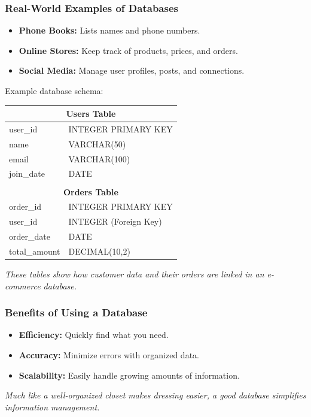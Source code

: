 \documentclass[10pt]{beamer}
\begin{document}
\begin{frame}[fragile]
  \frametitle{Real-World Examples of Databases}
  \begin{itemize}
    \item \textbf{Phone Books:} Lists names and phone numbers.
    \item \textbf{Online Stores:} Keep track of products, prices, and orders.
    \item \textbf{Social Media:} Manage user profiles, posts, and connections.
  \end{itemize}

  \vspace{1em}
  Example database schema:
  \begin{center}
    \begin{tabular}{ll}
      \hline
      \multicolumn{2}{c}{\textbf{Users Table}} \\
      \hline
      user\_id & INTEGER PRIMARY KEY \\
      name & VARCHAR(50) \\
      email & VARCHAR(100) \\
      join\_date & DATE \\
      \hline
      \\
      \multicolumn{2}{c}{\textbf{Orders Table}} \\
      \hline
      order\_id & INTEGER PRIMARY KEY \\
      user\_id & INTEGER (Foreign Key) \\
      order\_date & DATE \\
      total\_amount & DECIMAL(10,2) \\
      \hline
    \end{tabular}
  \end{center}
  \textit{These tables show how customer data and their orders are linked in an e-commerce database.}
\end{frame}

\begin{frame}[fragile]
  \frametitle{Benefits of Using a Database}
  \begin{itemize}
    \item \textbf{Efficiency:} Quickly find what you need.
    \item \textbf{Accuracy:} Minimize errors with organized data.
    \item \textbf{Scalability:} Easily handle growing amounts of information.
  \end{itemize}
  \textit{Much like a well-organized closet makes dressing easier, a good database simplifies information management.}
\end{frame}
\end{document}
